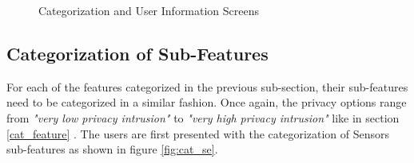 \begin{figure}[htp]
  \hspace{1em}
  \caption{Categorization and User Information Screens}
  \label{fig:cat}
\end{figure}

\subsection{Categorization of Sub-Features}
For each of the features categorized in the previous sub-section, their sub-features need to be categorized in a similar fashion. Once again,
the privacy options range from \textit{"very low privacy intrusion"} to \textit{"very high privacy intrusion"} like in section \ref{cat_feature} . The users are first presented with
the categorization of Sensors sub-features as shown in figure \ref{fig:cat_se}. 


